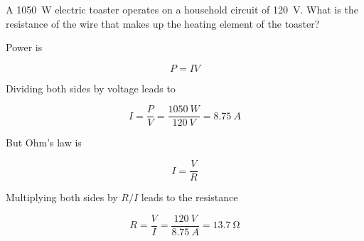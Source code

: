 \documentclass[]{exam}
\begin{document}
\begin{questions}

\question
A \SI{1050}{W} electric toaster operates on a household circuit of \SI{120}{V}. What is the resistance of the wire that makes up the heating element of the toaster?

\begin{solution}
Power is 

\begin{equation*}
    P = I V
\end{equation*}

Dividing both sides by voltage leads to 

\begin{equation*}
    I = \frac{P}{V} = \frac{\SI{1050}{W}}{\SI{120}{V}} = \SI{8.75}{A}
\end{equation*}

But Ohm's law is

\begin{equation*}
    I = \frac{V}{R}
\end{equation*}

Multiplying both sides by $R/I$ leads to the resistance

\begin{equation*}
    R = \frac{V}{I} = \frac{\SI{120}{V}}{\SI{8.75}{A}} = \boxed{\SI{13.7}{\ohm}}
\end{equation*}
\end{solution}


\end{questions}
\end{document}
